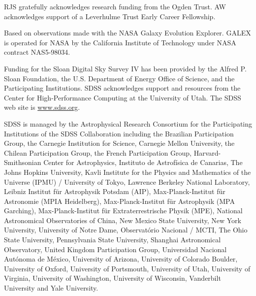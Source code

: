 \documentclass[useAMS,usenatbib]{mn2e}
\begin{document}
RJS gratefully acknowledges research funding from the Ogden Trust. AW acknowledges support of a Leverhulme Trust Early Career Fellowship.

Based on observations made with the NASA Galaxy Evolution Explorer.  GALEX is operated for NASA by the California Institute of Technology under NASA contract NAS5-98034.

Funding for the Sloan Digital Sky Survey IV has been provided by the Alfred P. Sloan Foundation, the U.S. Department of Energy Office of Science, and the Participating Institutions. SDSS acknowledges support and resources from the Center for High-Performance Computing at the University of Utah. The SDSS web site is \url{www.sdss.org}.

SDSS is managed by the Astrophysical Research Consortium for the Participating Institutions of the SDSS Collaboration including the Brazilian Participation Group, the Carnegie Institution for Science, Carnegie Mellon University, the Chilean Participation Group, the French Participation Group, Harvard-Smithsonian Center for Astrophysics, Instituto de Astrof\'isica de Canarias, The Johns Hopkins University, Kavli Institute for the Physics and Mathematics of the Universe (IPMU) / University of Tokyo, Lawrence Berkeley National Laboratory, Leibniz Institut für Astrophysik Potsdam (AIP), Max-Planck-Institut f\"ur Astronomie (MPIA Heidelberg), Max-Planck-Institut für Astrophysik (MPA Garching), Max-Planck-Institut f\"ur Extraterrestrische Physik (MPE), National Astronomical Observatories of China, New Mexico State University, New York University, University of Notre Dame, Observat\'orio Nacional / MCTI, The Ohio State University, Pennsylvania State University, Shanghai Astronomical Observatory, United Kingdom Participation Group, Universidad Nacional Aut\'onoma de M\'exico, University of Arizona, University of Colorado Boulder, University of Oxford, University of Portsmouth, University of Utah, University of Virginia, University of Washington, University of Wisconsin, Vanderbilt University and Yale University.


  



\end{document}
